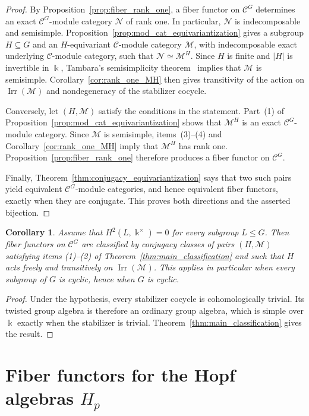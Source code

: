 \documentclass[12pt]{amsart}
\theoremstyle{plain}
\newtheorem{corollary}[theorem]{Corollary}
\theoremstyle{definition} %
\theoremstyle{remark} %
\newcommand{\ku}{{\Bbbk}} %
\newcommand{\cC}{\mathcal{C}}
\newcommand{\cM}{\mathcal{M}}
\newcommand{\cN}{\mathcal{N}}
\newcommand{\Irr}{\operatorname{Irr}}
\begin{document}
\begin{proof}
By Proposition~\ref{prop:fiber_rank_one}, a fiber functor on $\cC^G$ determines an exact $\cC^G$-module category $\cN$ of rank one. In particular, $\cN$ is indecomposable and semisimple. Proposition~\ref{prop:mod_cat_equivariantization} gives a subgroup $H\subseteq G$ and an $H$-equivariant $\cC$-module category $\cM$, with indecomposable exact underlying $\cC$-module category, such that $\cN\simeq\cM^H$. Since $H$ is finite and $|H|$ is invertible in $\ku$, Tambara's semisimplicity theorem~\cite[Proposition~5.2]{T01} implies that $\cM$ is semisimple. Corollary~\ref{cor:rank_one_MH} then gives transitivity of the action on $\Irr(\cM)$ and nondegeneracy of the stabilizer cocycle.

Conversely, let $(H,\cM)$ satisfy the conditions in the statement. Part~(1) of Proposition~\ref{prop:mod_cat_equivariantization} shows that $\cM^H$ is an exact $\cC^G$-module category. Since $\cM$ is semisimple, items~\textup{(3)--(4)} and Corollary~\ref{cor:rank_one_MH} imply that $\cM^H$ has rank one. Proposition~\ref{prop:fiber_rank_one} therefore produces a fiber functor on $\cC^G$.

Finally, Theorem~\ref{thm:conjugacy_equivariantization} says that two such pairs yield equivalent $\cC^G$-module categories, and hence equivalent fiber functors, exactly when they are conjugate. This proves both directions and the asserted bijection.
\end{proof}

\begin{corollary}\label{cor:cohomologically_trivial}
Assume that $H^2(L,\ku^\times)=0$ for every subgroup $L\leq G$. Then fiber functors on $\cC^G$ are classified by conjugacy classes of pairs $(H,\cM)$ satisfying items \textup{(1)--(2)} of Theorem~\ref{thm:main_classification} and such that $H$ acts freely and transitively on $\Irr(\cM)$. This applies in particular when every subgroup of $G$ is cyclic, hence when $G$ is cyclic.
\end{corollary}

\begin{proof}
Under the hypothesis, every stabilizer cocycle is cohomologically trivial. Its twisted group algebra is therefore an ordinary group algebra, which is simple over $\ku$ exactly when the stabilizer is trivial. Theorem~\ref{thm:main_classification} gives the result.
\end{proof}

\section{Fiber functors for the Hopf algebras \texorpdfstring{$H_p$}{Hp}}\label{sec:nikshych}
\end{document}
